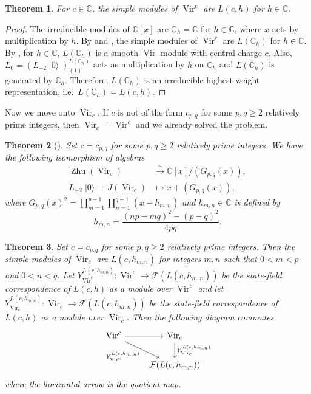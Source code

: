 \documentclass[a4paper, 12pt, reqno]{amsart}
\newtheorem{theorem}{Theorem}[section]
\theoremstyle{remark}
\numberwithin{equation}{subsection}
\DeclareMathOperator{\Vir}{Vir}
\DeclareMathOperator{\vac}{|0\rangle}
\DeclareMathOperator{\Zhu}{Zhu}
\begin{document}
\begin{theorem}
  \label{thr:38}
  For $c \in \mathbb{C}$, the simple modules of $\Vir^c$ are $L(c, h)$ for $h \in \mathbb{C}$.
\end{theorem}

\begin{proof}
  The irreducible modules of $\mathbb{C}[x]$ are $\mathbb{C}_h = \mathbb{C}$ for $h \in \mathbb{C}$, where $x$ acts by multiplication by $h$.
  By  and , the simple modules of $\Vir^c$ are $L(\mathbb{C}_h)$ for $h \in \mathbb{C}$.
  By , for $h \in \mathbb{C}$, $L(\mathbb{C}_h)$ is a smooth $\Vir$-module with central charge $c$.
  Also, $L_0 = (L_{-2}\vac)^{L(\mathbb{C}_h)}_{(1)}$ acts as multiplication by $h$ on $\mathbb{C}_h$ and $L(\mathbb{C}_h)$ is generated by $\mathbb{C}_h$.
  Therefore, $L(\mathbb{C}_h)$ is an irreducible highest weight representation, i.e.\ $L(\mathbb{C}_h) = L(c, h)$.
\end{proof}

Now we move onto $\Vir_c$.
If $c$ is not of the form $c_{p, q}$ for some $p, q \ge 2$ relatively prime integers, then $\Vir_c = \Vir^c$ and we already solved the problem.

\begin{theorem}[{\cite{wang_rationality_1993}}]
  \label{thr:39}
  Set $c = c_{p, q}$ for some $p, q \ge 2$ relatively prime integers.
  We have the following isomorphism of algebras
  \begin{align*}
    \Zhu(\Vir_c) &\xrightarrow{\sim} \mathbb{C}[x]/(G_{p, q}(x)), \\
    L_{-2}\vac + J(\Vir_c) &\mapsto x + (G_{p, q}(x)),
  \end{align*}
  where $G_{p ,q}(x)^2 = \prod_{m = 1}^{p - 1}\prod_{n = 1}^{q - 1}(x - h_{m, n})$ and $h_{m, n} \in \mathbb{C}$ is defined by
  \begin{equation}
    \label{eq:30}
    h_{m, n} = \frac{(np - mq)^2 - (p - q)^2}{4pq}.
  \end{equation}
\end{theorem}

\begin{theorem}
  \label{thr:40}
  Set $c = c_{p, q}$ for some $p, q \ge 2$ relatively prime integers.
  Then the simple modules of $\Vir_c$ are $L(c, h_{m, n})$ for integers $m, n$ such that $0 < m < p$ and $0 < n < q$.
  Let $Y^{L(c, h_{m, n})}_{\Vir^c}: \Vir^c \to \mathcal{F}(L(c, h_{m, n}))$ be the state-field correspondence of $L(c, h)$ as a module over $\Vir^c$ and let $Y^{L(c, h_{m, n})}_{\Vir_c}: \Vir_c \to \mathcal{F}(L(c, h_{m, n}))$ be the state-field correspondence of $L(c, h)$ as a module over $\Vir_c$.
  Then the following diagram commutes
  \begin{equation*}
    \begin{tikzcd}
      \Vir^c \arrow[r] \arrow[rd, "{Y^{L(c, h_{m, n})}_{\Vir^c}}"'] & {\Vir_c} \arrow[d, "{Y^{L(c, h_{m, n})}_{\Vir_c}}"] \\
      & {\mathcal{F}(L(c, h_{m, n}))}
    \end{tikzcd}
  \end{equation*}
  where the horizontal arrow is the quotient map.
\end{theorem}
\end{document}
